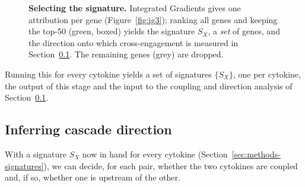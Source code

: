 \documentclass[11pt,a4paper]{article}
\begin{document}
\begin{figure}[H]
\centering
{}
\caption{\textbf{Selecting the signature.} Integrated Gradients gives one attribution per gene
(Figure~\ref{fig:ig3}); ranking all genes and keeping the top-50 (green, boxed) yields the
signature $S_X$, a \emph{set} of genes, and the direction onto which cross-engagement is
measured in Section~\ref{sec:methods-direction}. The remaining genes (grey) are dropped.}
\label{fig:sigselect}
\end{figure}

Running this for every cytokine yields a set of signatures $\{S_X\}$, one per cytokine, the output of this stage and the input to the coupling and direction analysis of Section~\ref{sec:methods-direction}.

\subsection{Inferring cascade direction}
\label{sec:methods-direction}
With a signature $S_X$ now in hand for every cytokine (Section~\ref{sec:methods-signatures}), we can decide, for each pair, whether the two cytokines are coupled and, if so, whether one is upstream of the other.
\end{document}
